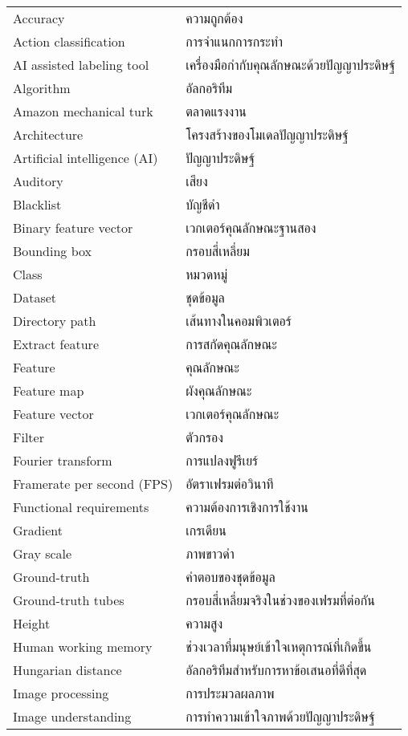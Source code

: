 \begin{abbreviations}
    \noindent
    \begin{tabular*}{\textwidth}{@{}p{}p{}@{}}
	Accuracy     &   ความถูกต้อง\\
        Action classification  &  การจำแนกการกระทำ\\
        AI assisted labeling tool  &   เครื่องมือกำกับคุณลักษณะด้วยปัญญาประดิษฐ์\\
	Algorithm   &     อัลกอริทึม\\
        Amazon mechanical turk & ตลาดแรงงาน\\
	Architecture  &  โครงสร้างของโมเดลปัญญาประดิษฐ์\\
	Artificial intelligence (AI) &           ปัญญาประดิษฐ์\\
        Auditory  &      เสียง\\
	Blacklist    &    บัญชีดำ\\
        Binary feature vector & เวกเตอร์คุณลักษณะฐานสอง\\
	Bounding box  &  กรอบสี่เหลี่ยม\\
        Class        &    หมวดหมู่\\
        Dataset   &      ชุดข้อมูล\\
	Directory path &   เส้นทางในคอมพิวเตอร์\\
        Extract feature & การสกัดคุณลักษณะ \\
        Feature     &    คุณลักษณะ\\
        Feature map  &  ผังคุณลักษณะ\\
        Feature vector  &  เวกเตอร์คุณลักษณะ\\
        Filter & ตัวกรอง\\
        Fourier transform &  การแปลงฟูรีเยร์\\
        Framerate per second (FPS) & อัตราเฟรมต่อวินาที \\
        Functional requirements & ความต้องการเชิงการใช้งาน\\
        Gradient    &    เกรเดียน\\
        Gray scale     &   ภาพขาวดำ\\
        Ground-truth &   คำตอบของชุดข้อมูล\\        
	Ground-truth tubes & กรอบสี่เหลี่ยมจริงในช่วงของเฟรมที่ต่อกัน\\
        Height     &   ความสูง\\
	Human working memory & ช่วงเวลาที่มนุษย์เข้าใจเหตุการณ์ที่เกิดขึ้น\\
	Hungarian distance & อัลกอริทึมสำหรับการหาข้อเสนอที่ดีที่สุด\\
        Image processing   & การประมวลผลภาพ\\
        Image understanding & การทำความเข้าใจภาพด้วยปัญญาประดิษฐ์\\
    \end{tabular*}
\end{abbreviations}

